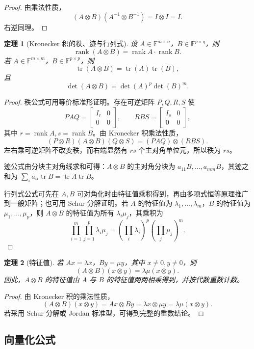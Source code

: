 \documentclass[UTF8,openany,zihao=-4]{ctexbook}
\theoremstyle{cnplain}
\newtheorem{theorem}{定理}[chapter]
\newcommand{\F}{\mathbb F}
\newcommand{\rank}{\operatorname{rank}}
\newcommand{\tr}{\operatorname{tr}}
\newcommand{\mat}[1]{\begin{bmatrix}#1\end{bmatrix}}
\begin{document}
\begin{proof}
由乘法性质，
\[
(A\otimes B)(A^{-1}\otimes B^{-1})=I\otimes I=I.
\]
右逆同理。
\end{proof}

\begin{theorem}[Kronecker 积的秩、迹与行列式]
设 $A\in\F^{m\times n}$，$B\in\F^{p\times q}$，则
\[
\rank(A\otimes B)=\rank A\cdot\rank B.
\]
若 $A\in\F^{m\times m}$，$B\in\F^{p\times p}$，则
\[
\tr(A\otimes B)=\tr(A)\tr(B),
\]
且
\[
\det(A\otimes B)=\det(A)^p\det(B)^m.
\]
\end{theorem}

\begin{proof}
秩公式可用等价标准形证明。存在可逆矩阵 $P,Q,R,S$ 使
\[
PAQ=\mat{I_r&0\\0&0},
\qquad
RBS=\mat{I_s&0\\0&0},
\]
其中 $r=\rank A,s=\rank B$。由 Kronecker 积乘法性质，
\[
(P\otimes R)(A\otimes B)(Q\otimes S)=(PAQ)\otimes(RBS).
\]
左右乘可逆矩阵不改变秩，而右端显然有 $rs$ 个主对角单位元，所以秩为 $rs$。

迹公式由分块主对角线求和可得：$A\otimes B$ 的主对角分块为 $a_{11}B,
\ldots,a_{mm}B$，其迹之和为 $\sum_i a_{ii}\tr B=\tr A\tr B$。

行列式公式可先在 $A,B$ 可对角化时由特征值乘积得到，再由多项式恒等原理推广到一般矩阵；也可用 Schur 分解证明。若 $A$ 的特征值为 $\lambda_1,
\ldots,\lambda_m$，$B$ 的特征值为 $\mu_1,
\ldots,\mu_p$，则 $A\otimes B$ 的特征值为所有 $\lambda_i\mu_j$，其乘积为
\[
\prod_{i=1}^m\prod_{j=1}^p\lambda_i\mu_j
=\left(\prod_i\lambda_i\right)^p
\left(\prod_j\mu_j\right)^m.
\]
\end{proof}

\begin{theorem}[特征值]
若 $Ax=\lambda x$，$By=\mu y$，其中 $x\ne0,y\ne0$，则
\[
(A\otimes B)(x\otimes y)=\lambda\mu(x\otimes y).
\]
因此，$A\otimes B$ 的特征值由 $A$ 与 $B$ 的特征值两两相乘得到，并按代数重数计数。
\end{theorem}

\begin{proof}
由 Kronecker 积的乘法性质，
\[
(A\otimes B)(x\otimes y)=Ax\otimes By
=\lambda x\otimes \mu y
=\lambda\mu(x\otimes y).
\]
若采用 Schur 分解或 Jordan 标准型，可得到完整的重数结论。
\end{proof}

\subsection{向量化公式}
\end{document}

